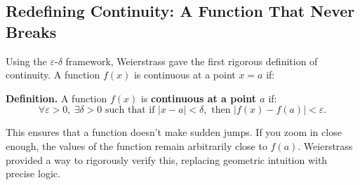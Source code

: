 \subsection{Redefining Continuity: A Function That Never Breaks}

Using the \(\varepsilon\)-\(\delta\) framework, Weierstrass gave the first rigorous definition of continuity. A function \( f(x) \) is continuous at a point \( x = a \) if:

\vspace{0.5em}
\noindent\textbf{Definition.}
A function \( f(x) \) is \textbf{continuous at a point \( a \)} if:
\[
\forall \varepsilon > 0,\ \exists \delta > 0 \text{ such that if } |x - a| < \delta, \text{ then } |f(x) - f(a)| < \varepsilon.
\]
\vspace{1em}

This ensures that a function doesn't make sudden jumps. If you zoom in close enough, the values of the function remain arbitrarily close to \( f(a) \). Weierstrass provided a way to rigorously verify this, replacing geometric intuition with precise logic.

